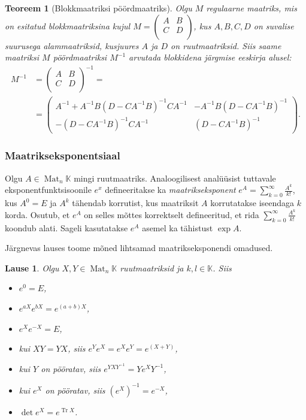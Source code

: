 \documentclass[12pt,a4paper,oneside]{article}
\theoremstyle{plain}
\newtheorem{teoreem}{Teoreem}[section]
\newtheorem{lause}{Lause}[section]
\theoremstyle{definition}
\numberwithin{equation}{section}
\def\K{{\mathbb K}}
\DeclareMathOperator{\Mat}{Mat}
\DeclareMathOperator{\Tr}{Tr}
\begin{document}
\begin{teoreem}[Blokkmaatriksi pöördmaatriks]
Olgu $M$ regulaarne maatriks, mis on esitatud blokkmaatriksina kujul 
$M = \begin{pmatrix} A & B \\ C & D \\ \end{pmatrix}$, kus $A, B, C, D$ 
on suvalise suurusega alammaatriksid, kusjuures $A$ ja $D$ on 
ruutmaatriksid. Siis saame maatriksi $M$ pöördmaatriksi $M^{-1}$ 
arvutada blokkidena järgmise eeskirja alusel:
\begin{align*}
M^{-1} &= \begin{pmatrix}
A & B \\ C & D \\
\end{pmatrix}^{-1} = \qquad\qquad\qquad\qquad\qquad \\
&= \begin{pmatrix}
A^{-1}+A^{-1}B\left(D-CA^{-1}B\right)^{-1}CA^{-1} & 
	-A^{-1}B\left(D-CA^{-1}B\right)^{-1} \\
-\left(D- CA^{-1}B\right)^{-1}CA^{-1} & \left(D-CA^{-1}B\right)^{-1}
\end{pmatrix}.
\end{align*}
\end{teoreem}

\subsubsection*{Maatrikseksponentsiaal}

Olgu $A \in \Mat_n\K$ mingi ruutmaatriks. Analoogilisest analüüsist 
tuttavale eksponentfunktsisoonile $e^x$ defineeritakse ka 
\emph{maatrikseksponent} $e^A = \sum_{k = 0}^{\infty} \frac{A^k}{k!}$, 
kus $A^0 = E$ ja $A^k$ tähendab korrutist, kus maatriksit $A$ 
korrutatakse iseendaga $k$ korda. Osutub, et $e^A$ on selles mõttes 
korrektselt defineeritud, et rida 
$\sum_{k = 0}^{\infty} \frac{A^k}{k!}$ koondub alati. 
Sageli kasutatakse $e^A$ asemel ka tähistust $\exp A$.

Järgnevas lauses toome mõned lihtsamad maatrikseksponendi omadused.
\begin{lause}
Olgu $X, Y \in \Mat_n \K$ ruutmaatriksid ja $k, l \in \K$. Siis
\begin{itemize}
\item $e^0 = E$,
\item $e^{aX}e^{bX} = e^{\left(a+b\right)X}$,
\item $e^{X} e^{-X} = E$,
\item kui $XY = YX$, siis $e^Y e^X = e^X e^Y = e^{\left(X + Y\right)}$,
\item kui $Y$ on pööratav, siis $e^{YXY^{-1}} = Ye^XY^{-1}$,
\item kui $e^X$ on pööratav, siis $\left(e^X\right)^{-1} = e^{-X}$,
\item $\det e^X = e^{\Tr X}$.
\end{itemize}
\end{lause}
\end{document}
